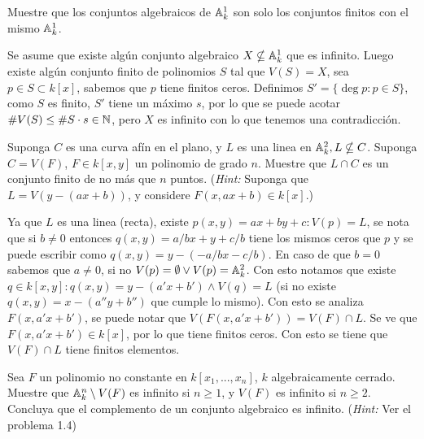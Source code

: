 \begin{prob}{1.8}
    Muestre que los conjuntos algebraicos de $\mathbb{A}_k^1$ son solo los conjuntos finitos con el mismo $\mathbb{A}_k^1$.
\end{prob}

\begin{sol}{1.8}
    Se asume que existe algún conjunto algebraico $X\nsubseteq\mathbb{A}_k^1$ que es infinito. Luego existe algún conjunto finito de polinomios $S$ tal que $V(S)=X$, sea $p\in S\subset k[x]$, sabemos que $p$ tiene finitos ceros. Definimos $S'=\{\deg p:p\in S\}$, como $S$ es finito, $S'$ tiene un máximo $s$, por lo que se puede acotar $\#V(S)\leq \#S\cdot s\in\mathbb{N}$, pero $X$ es infinito con lo que tenemos una contradicción.
\end{sol}

\begin{prob}{1.12}
    Suponga $C$ es una curva afín en el plano, y $L$ es una linea en $\mathbb{A}^2_k,L\nsubseteq C$. Suponga $C=V(F)$, $F\in k[x,y]$ un polinomio de grado $n$. Muestre que $L\cap C$ es un conjunto finito de no más que $n$ puntos. (\textit{Hint:} Suponga que $L=V(y-(ax+b))$, y considere $F(x,ax+b)\in k[x]$.)
\end{prob}

\begin{sol}{1.12}
    Ya que $L$ es una linea (recta), existe $p(x,y)=ax+by+c:V(p)=L$, se nota que si $b\neq 0$ entonces $q(x,y)=a/bx+y+c/b$ tiene los mismos ceros que $p$ y se puede escribir como $q(x,y)=y-(-a/bx-c/b)$. En caso de que $b=0$ sabemos que $a\neq 0$, si no $V(p)=\emptyset\vee V(p)=\mathbb{A}_k^2$. Con esto notamos que existe $q\in k[x,y]:q(x,y)=y-(a'x+b')\wedge V(q)=L$ (si no existe $q(x,y)=x-(a''y+b'')$ que cumple lo mismo). Con esto se analiza $F(x,a'x+b')$, se puede notar que $V(F(x,a'x+b'))=V(F)\cap L$. Se ve que $F(x,a'x+b')\in k[x]$, por lo que tiene finitos ceros. Con esto se tiene que $V(F)\cap L$ tiene finitos elementos.
\end{sol}

\begin{prob}{1.14}
    Sea $F$ un polinomio no constante en $k[x_1,...,x_n]$, $k$ algebraicamente cerrado. Muestre que $\mathbb{A}_k^n\setminus V(F)$ es infinito si $n\geq1$, y $V(F)$ es infinito si $n\geq2$. Concluya que el complemento de un conjunto algebraico es infinito. (\textit{Hint:} Ver el problema 1.4)
\end{prob}

